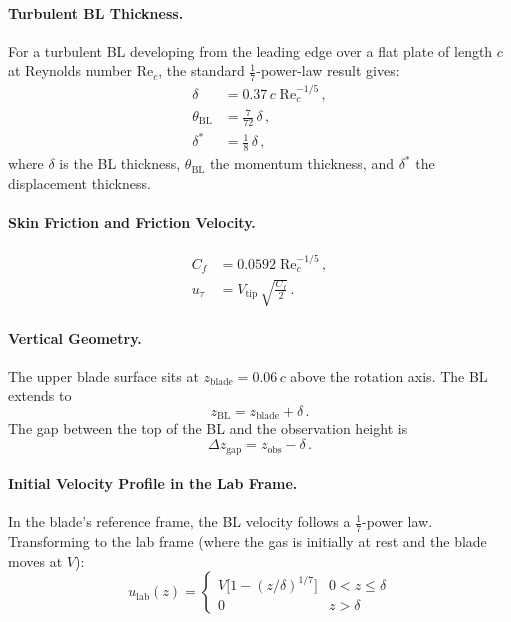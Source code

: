 \documentclass[11pt,a4paper]{article}
\begin{document}
\paragraph{Turbulent BL Thickness.}
For a turbulent BL developing from the leading edge over a flat plate
of length $c$ at Reynolds number $\mathrm{Re}_c$, the standard
$\tfrac{1}{7}$-power-law result gives:
\begin{align}
  \delta &= 0.37\,c\;\mathrm{Re}_c^{-1/5}\,,
    \label{eq:delta} \\
  \theta_\mathrm{BL} &= \frac{7}{72}\,\delta\,,
    \label{eq:theta_BL} \\
  \delta^* &= \frac{1}{8}\,\delta\,,
    \label{eq:dstar}
\end{align}
where $\delta$ is the BL thickness, $\theta_\mathrm{BL}$ the momentum
thickness, and $\delta^*$ the displacement thickness.

\paragraph{Skin Friction and Friction Velocity.}
\begin{align}
  C_f &= 0.0592\;\mathrm{Re}_c^{-1/5}\,,
    \label{eq:Cf} \\
  u_\tau &= V_\mathrm{tip}\,\sqrt{\frac{C_f}{2}}\,.
    \label{eq:utau}
\end{align}

\paragraph{Vertical Geometry.}
The upper blade surface sits at $z_\mathrm{blade} = 0.06\,c$ above the
rotation axis. The BL extends to
\begin{equation}
  z_\mathrm{BL} = z_\mathrm{blade} + \delta\,.
\end{equation}
The gap between the top of the BL and the observation height is
\begin{equation}
  \Delta z_\mathrm{gap} = z_\mathrm{obs} - \delta\,.
  \label{eq:gap}
\end{equation}

\paragraph{Initial Velocity Profile in the Lab Frame.}
In the blade's reference frame, the BL velocity follows a
$\tfrac{1}{7}$-power law. Transforming to the lab frame (where the gas
is initially at rest and the blade moves at $V$):
\begin{equation}
  u_\mathrm{lab}(z) =
  \begin{cases}
    V\bigl[1 - (z/\delta)^{1/7}\bigr] & 0 < z \le \delta \\
    0 & z > \delta
  \end{cases}
  \label{eq:ulab}
\end{equation}
\end{document}
